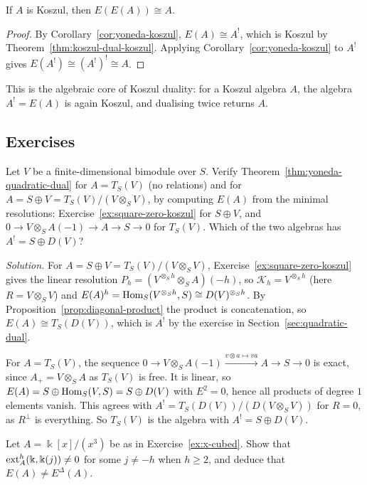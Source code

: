 \begin{corollary}\label{cor:yoneda-double}
If $A$ is Koszul, then $E(E(A))\cong A$.
\end{corollary}

\begin{proof}
By Corollary~\ref{cor:yoneda-koszul}, $E(A)\cong A^!$, which is Koszul by Theorem~\ref{thm:koszul-dual-koszul}.
Applying Corollary~\ref{cor:yoneda-koszul} to $A^!$ gives $E(A^!)\cong(A^!)^!\cong A$.
\end{proof}

This is the algebraic core of Koszul duality: for a Koszul algebra $A$, the algebra $A^!=E(A)$ is again Koszul, and dualising twice returns $A$.

\subsection{Exercises}

\begin{exercise}
Let $V$ be a finite-dimensional bimodule over $S$.
Verify Theorem~\ref{thm:yoneda-quadratic-dual} for $A=T_S(V)$ (no relations) and for $A=S\oplus V=T_S(V)/(V\otimes_SV)$, by computing $E(A)$ from the minimal resolutions: Exercise~\ref{ex:square-zero-koszul} for $S\oplus V$, and $0\to V\otimes_SA(-1)\to A\to S\to0$ for $T_S(V)$.
Which of the two algebras has $A^!=S\oplus D(V)$?
\end{exercise}

\begin{hidden}
\emph{Solution.}
For $A=S\oplus V=T_S(V)/(V\otimes_SV)$, Exercise~\ref{ex:square-zero-koszul} gives the linear resolution $P_h=(V^{\otimes_Sh}\otimes_SA)(-h)$, so $\mathcal K_h=V^{\otimes_Sh}$ (here $R=V\otimes_SV$) and $E(A)^h=\operatorname{Hom}\nolimits_S(V^{\otimes_Sh},S)\cong D(V)^{\otimes_Sh}$.
By Proposition~\ref{prop:diagonal-product} the product is concatenation, so $E(A)\cong T_S(D(V))$, which is $A^!$ by the exercise in Section~\ref{sec:quadratic-dual}.

For $A=T_S(V)$, the sequence $0\to V\otimes_SA(-1)\xrightarrow{v\otimes a\mapsto va}A\to S\to0$ is exact, since $A_+=V\otimes_SA$ as $T_S(V)$ is free.
It is linear, so $E(A)=S\oplus\operatorname{Hom}\nolimits_S(V,S)=S\oplus D(V)$ with $E^2=0$, hence all products of degree $1$ elements vanish.
This agrees with $A^!=T_S(D(V))/(D(V\otimes_SV))$ for $R=0$, as $R^\perp$ is everything.
So $T_S(V)$ is the algebra with $A^!=S\oplus D(V)$.
\end{hidden}


\begin{exercise}
Let $A=\Bbbk[x]/(x^3)$ be as in Exercise~\ref{ex:x-cubed}.
Show that $\operatorname{ext}\nolimits_A^h(\Bbbk,\Bbbk(j))\neq0$ for some $j\neq-h$ when $h\geq2$, and deduce that $E(A)\neq E^\Delta(A)$.
\end{exercise}

